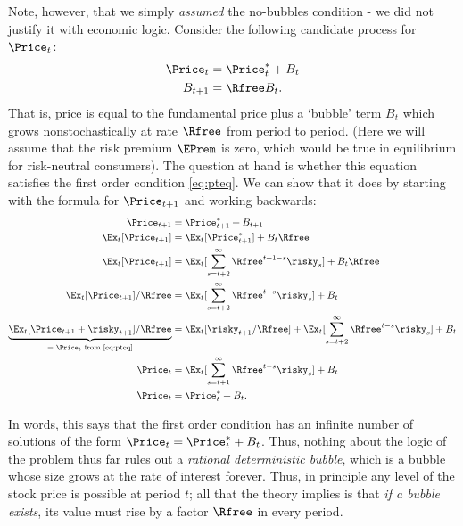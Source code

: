 \documentclass{handout}
\begin{document}
Note, however, that we simply {\it assumed} the no-bubbles condition - 
we did not justify it with economic logic.  Consider the following 
candidate process for $\Price_{t}$:
\begin{equation}\begin{gathered}\begin{aligned}
        \Price_{t} & =  \Price_{t}^{*}+B_{t} \label{eq:pbubble} \\
        B_{t+1} & =  \Rfree B_{t}
.
\end{aligned}\end{gathered}\end{equation}
That is, price is equal to the fundamental price plus a `bubble' term 
$B_{t}$ which grows nonstochastically at rate $\Rfree$ from period to 
period.  (Here we will assume that the risk premium $\EPrem$ is zero, which would be 
true in equilibrium for risk-neutral consumers).  The question at hand is whether this equation satisfies 
the first order condition \eqref{eq:pteq}.  We can show that it
does by starting with the formula for $\Price_{t+1}$ and working backwards:
\begin{equation}\begin{gathered}\begin{aligned}
        \Price_{t+1} & =  \Price_{t+1}^{*}+B_{t+1}  \\
        \Ex_{t}[\Price_{t+1}] & =  \Ex_{t}[\Price_{t+1}^{*}]+ B_{t} \Rfree 
\\      \Ex_{t}[\Price_{t+1}] & =  \Ex_{t}[\sum_{s=t+2}^{\infty}\Rfree^{t+1-s}\risky_{s}]+ B_{t}  \Rfree 
\\      \Ex_{t}[\Price_{t+1}]/\Rfree & =  \Ex_{t}[\sum_{s=t+2}^{\infty}\Rfree^{t-s}\risky_{s}]+ B_{t}
\\      \underbrace{\Ex_{t}[\Price_{t+1}+\risky_{t+1}]/\Rfree }_{\text{= $\Price_{t}$ from \eqref{eq:pteq}}} & =  \Ex_{t}[\risky_{t+1}/\Rfree ] + \Ex_{t}[\sum_{s=t+2}^{\infty}\Rfree^{t-s}\risky_{s}]+ B_{t}
\\      \Price_{t} & =  \Ex_{t}[\sum_{s=t+1}^{\infty}\Rfree^{t-s}\risky_{s}]+ B_{t}
\\      \Price_{t} & =  \Price_{t}^{*}+ B_{t}.
\end{aligned}\end{gathered}\end{equation}


In words, this says that the first order condition has an infinite number of solutions of 
the form $\Price_{t}= \Price_{t}^{*}+B_{t}$.  Thus, nothing about the logic of 
the problem thus far rules out a {\it rational deterministic bubble}, 
which is a bubble whose size grows at the rate of interest forever.  
Thus, in principle any level of the stock price is possible at period 
$t$; all that the theory implies is that {\it if a bubble exists}, its 
value must rise by a factor $\Rfree$ in every period.
\end{document}
